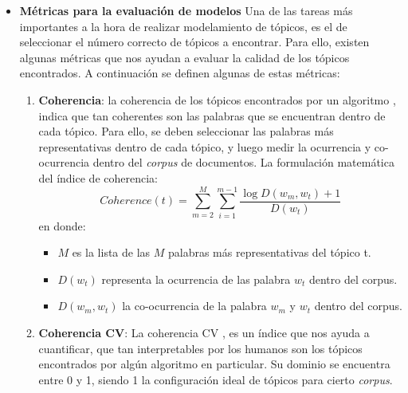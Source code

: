 \begin{itemize}
\item \textbf{Métricas para la evaluación de modelos} 
    Una de las tareas más importantes a la hora de realizar modelamiento de tópicos, es el de seleccionar el número correcto de tópicos a encontrar. Para ello, existen algunas métricas que nos ayudan a evaluar la calidad de los tópicos encontrados. A continuación se definen algunas de estas métricas:
    \begin{enumerate}
        \item \textbf{Coherencia}: la coherencia de los tópicos encontrados por un algoritmo \cite{mimno2011optimizing}, indica que tan coherentes son las palabras que se encuentran dentro de cada tópico. Para ello, se deben seleccionar las palabras más representativas dentro de cada tópico, y luego medir la ocurrencia y co-ocurrencia dentro del \textit{corpus} de documentos. La formulación matemática del índice de coherencia:
        \begin{equation*}
            Coherence(t) = \sum_{m=2}^M\sum_{i=1}^{m-1}\frac{\log{ D(w_m,w_t)+1}}{D(w_t)}
        \end{equation*}
        en donde:
        \begin{itemize}
            \item $M$ es la lista de las $M$ palabras más representativas del tópico t.
            \item $D(w_t)$ representa la ocurrencia de las palabra $w_t$ dentro del corpus.
            \item $D(w_m,w_t)$ la co-ocurrencia de la palabra $w_m$ y $w_t$ dentro del corpus.
        \end{itemize}
        \item \textbf{Coherencia CV}: La coherencia CV \cite{roder2015exploring}, es un índice que nos ayuda a cuantificar, que tan interpretables por los humanos son los tópicos encontrados por algún algoritmo en particular. Su dominio se encuentra entre 0 y 1, siendo 1 la configuración ideal de tópicos para cierto \textit{corpus}.
    \end{enumerate}
\end{itemize}
     
